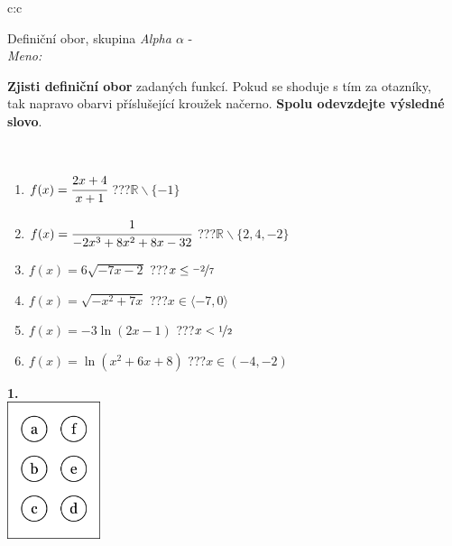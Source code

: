 \documentclass[10pt]{report}
\begin{document}
\thispagestyle{empty}
\begin{tabular}{c:c}
\begin{minipage}[c][104.5mm][t]{0.5\linewidth}
\begin{center}
\vspace{7mm}
{\huge Definiční obor, skupina \textit{Alpha $\alpha$} -}\\[5mm]
\textit{Meno:}\phantom{xxxxxxxxxxxxxxxxxxxxxxxxxxxxxxxxxxxxxxxxxxxxxxxxxxxxxxxxxxxxxxxxx}\\[5mm]
\begin{minipage}{0.95\linewidth}
\textbf{Zjisti definiční obor} zadaných funkcí. Pokud se shoduje s tím za otazníky,\\tak napravo obarvi příslušející kroužek načerno. \textbf{Spolu odevzdejte výsledné slovo}.
\end{minipage}
\\[1mm]
\begin{minipage}{0.79\linewidth}
\begin{center}
\begin{varwidth}{\linewidth}
\begin{enumerate}
\normalsizerrr
\item $f(x)=\cfrac{2x+4}{x+1}$\quad \dotfill\; ???\;\dotfill \quad $\mathbb{R}\smallsetminus\{-1\}$
\item $f(x)=\cfrac{1}{-2x^3+8x^2+8x-32}$\quad \dotfill\; ???\;\dotfill \quad $\mathbb{R}\smallsetminus\{2,4,-2\}$
\item $f(x)=6\sqrt{-7x-2}$\quad \dotfill\; ???\;\dotfill \quad $x\leq\nicefrac{-2}{7}$
\item $f(x)=\sqrt{-x^2+7x}$\quad \dotfill\; ???\;\dotfill \quad $x\in\langle-7 , 0\rangle$
\item $f(x)=-3\ln{(2x-1)}$\quad \dotfill\; ???\;\dotfill \quad $x<\nicefrac{1}{2}$
\item $f(x)=\ln{(x^2+6x+8)}$\quad \dotfill\; ???\;\dotfill \quad $x\in(-4 , -2)$
\end{enumerate}
\end{varwidth}
\end{center}
\end{minipage}
\begin{minipage}{0.20\linewidth}
\begin{center}
{\Huge\bfseries 1.} \\[2mm]
\includegraphics[height=40mm]{../images/braille.png}

\end{center}
\end{minipage}
\end{center}
\end{minipage}
\end{tabular}
\end{document}
